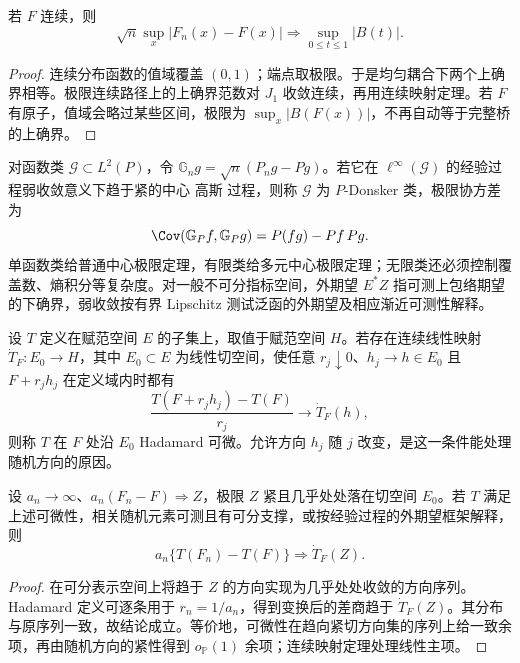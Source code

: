 \begin{corollary}
若 $F$ 连续，则
\[
 \sqrt n\sup_x|F_n(x)-F(x)|
 \Longrightarrow\sup_{0\le t\le1}|B(t)|.
\]
\end{corollary}
\begin{proof}
连续分布函数的值域覆盖 $(0,1)$；端点取极限。于是均匀耦合下两个上确界相等。极限连续路径上的上确界范数对 $J_1$ 收敛连续，再用连续映射定理。若 $F$ 有原子，值域会略过某些区间，极限为 $\sup_x|B(F(x))|$，不再自动等于完整桥的上确界。
\end{proof}

\begin{definition}[一般函数类的经验过程]
对函数类 $\mathcal G\subset L^2(P)$，令 $\mathbb G_ng=\sqrt n(P_ng-Pg)$。若它在 $\ell^\infty(\mathcal G)$ 的经验过程弱收敛意义下趋于紧的中心 高斯 过程，则称 $\mathcal G$ 为 $P$-Donsker 类，极限协方差为
\[
 \Cov(\mathbb G_Pf,\mathbb G_Pg)=P(fg)-Pf\,Pg.
\]
单函数类给普通中心极限定理，有限类给多元中心极限定理；无限类还必须控制覆盖数、熵积分等复杂度。对一般不可分指标空间，外期望 $E^*Z$ 指可测上包络期望的下确界，弱收敛按有界 Lipschitz 测试泛函的外期望及相应渐近可测性解释。
\end{definition}

\begin{definition}[Hadamard 可微]
设 $T$ 定义在赋范空间 $E$ 的子集上，取值于赋范空间 $H$。若存在连续线性映射 $\dot T_F:E_0\to H$，其中 $E_0\subset E$ 为线性切空间，使任意 $r_j\downarrow0$、$h_j\to h\in E_0$ 且 $F+r_jh_j$ 在定义域内时都有
\[
 \frac{T(F+r_jh_j)-T(F)}{r_j}\longrightarrow\dot T_F(h),
\]
则称 $T$ 在 $F$ 处沿 $E_0$ Hadamard 可微。允许方向 $h_j$ 随 $j$ 改变，是这一条件能处理随机方向的原因。
\end{definition}

\begin{theorem}[泛函 $\Delta$ 方法]
设 $a_n\to\infty$、$a_n(F_n-F)\Longrightarrow Z$，极限 $Z$ 紧且几乎处处落在切空间 $E_0$。若 $T$ 满足上述可微性，相关随机元素可测且有可分支撑，或按经验过程的外期望框架解释，则
\[
 a_n\{T(F_n)-T(F)\}\Longrightarrow\dot T_F(Z).
\]
\end{theorem}
\begin{proof}
在可分表示空间上将趋于 $Z$ 的方向实现为几乎处处收敛的方向序列。Hadamard 定义可逐条用于 $r_n=1/a_n$，得到变换后的差商趋于 $\dot T_F(Z)$。其分布与原序列一致，故结论成立。等价地，可微性在趋向紧切方向集的序列上给一致余项，再由随机方向的紧性得到 $o_{\mathbb P}(1)$ 余项；连续映射定理处理线性主项。
\end{proof}

